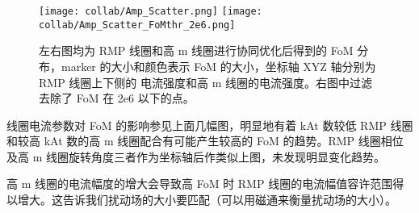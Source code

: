 \begin{figure}[htbp]
  \centering%
      \texttt{[image: collab/Amp\_Scatter.png]}
      \texttt{[image: collab/Amp\_Scatter\_FoMthr\_2e6.png]}
      \caption{左右图均为 RMP 线圈和高 m 线圈进行协同优化后得到的 FoM 分布，marker 的大小和颜色表示 FoM 的大小，坐标轴 XYZ 轴分别为 RMP 线圈上下侧的 电流强度和高 m 线圈的电流强度。右图中过滤去除了 FoM 在 2e6 以下的点。}
\end{figure}

  线圈电流参数对 FoM 的影响参见上面几幅图，明显地有着 kAt 数较低 RMP 线圈和较高 kAt 数的高 m 线圈配合有可能产生较高的 FoM 的趋势。RMP 线圈相位及高 m 线圈旋转角度三者作为坐标轴后作类似上图，未发现明显变化趋势。


  高 m 线圈的电流幅度的增大会导致高 FoM 时 RMP 线圈的电流幅值容许范围得以增大。这告诉我们扰动场的大小要匹配（可以用磁通来衡量扰动场的大小）。


  


  


    
  


    
  


